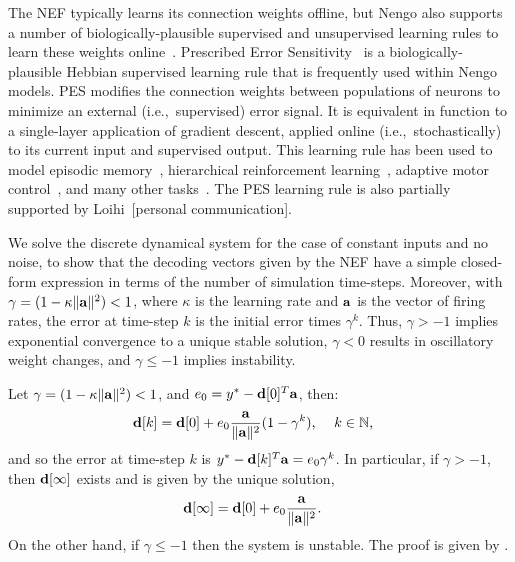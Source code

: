 The NEF typically learns its connection weights offline, but Nengo also supports a number of biologically-plausible supervised and unsupervised learning rules to learn these weights online~\citep{bekolay2011a}.
Prescribed Error Sensitivity~\citep[PES;][]{bekolay2013} is a biologically-plausible Hebbian supervised learning rule that is frequently used within Nengo models.
PES modifies the connection weights between populations of neurons to minimize an external (i.e.,~supervised) error signal.
It is equivalent in function to a single-layer application of gradient descent, applied online (i.e.,~stochastically) to its current input and supervised output.
This learning rule has been used to model episodic memory~\citep{trujillo2014}, hierarchical reinforcement learning~\citep{rasmussen2017}, adaptive motor control~\citep{komer2015, dewolf2016}, and many other tasks~\citep{aubin2018, choo2018}.
The PES learning rule is also partially supported by Loihi~[personal communication].

We solve the discrete dynamical system for the case of constant inputs and no noise, to show that the decoding vectors given by the NEF have a simple closed-form expression in terms of the number of simulation time-steps. Moreover, with $\gamma = (1 - \kappa \|\mathbf{a}\|^2) < 1$, where $\kappa$ is the learning rate and $\mathbf{a}$ is the vector of firing rates, the error at time-step $k$ is the initial error times $\gamma^k$. Thus, $\gamma > - 1$ implies exponential convergence to a unique stable solution, $\gamma < 0 $ results in oscillatory weight changes, and $\gamma \le -1$ implies instability.
\begin{lemma}
\label{lemma:pes-dynamics}
{\normalfont \citep{voelker2015}}
Let $\gamma = (1 - \kappa \|\mathbf{a}\|^2) < 1$, and $e_0 = y^* - \mathbf{d}[0]^T \mathbf{a}$, then:
\begin{align}
\label{eq:dk}
\mathbf{d}[k] &= \mathbf{d}[0] + e_0\frac{\mathbf{a}}{\|\mathbf{a}\|^2} (1 - \gamma^k)\text{, \quad $k \in \mathbb{N}$} \text{,}
\end{align}
and so the error at time-step $k$ is $y^* - \mathbf{d}[k]^T \mathbf{a} = e_0\gamma^k$. In particular, if $\gamma > - 1$, then $\mathbf{d}[\infty]$ exists and is given by the unique solution,
\begin{align}
\label{eq:dinf}
\mathbf{d}[\infty] &= \mathbf{d}[0] + e_0\frac{\mathbf{a}}{\|\mathbf{a}\|^2} .
\end{align}
On the other hand, if $\gamma \le -1$ then the system is unstable.
The proof is given by \citet{voelker2015}.
\end{lemma}

